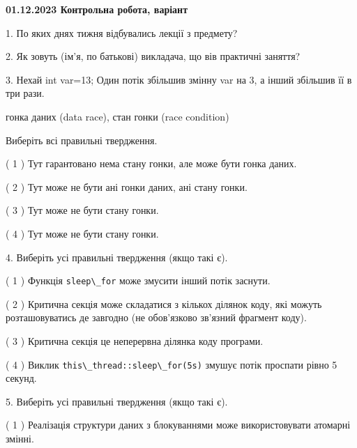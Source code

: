 \documentclass[12pt, ukrainian]{article}
\def\code#1{\Verb!#1!}
\begin{document}
\vspace{4mm}
\newpage
\begin {large}

\textbf{01.12.2023 Контрольна робота, варіант  }\par


{
1. По яких днях тижня відбувались лекції з предмету?



\vspace{5mm}
2. Як зовуть (ім'я, по батькові) викладача, що вів практичні заняття?



\vspace{5mm}
3. Нехай int var=13; Один потік збільшив змінну var на 3, а інший збільшив її в три рази.

гонка даних (data race), стан гонки (race condition)

Виберіть всі правильні твердження.\par
\vspace{2mm}
( 1 ) Тут гарантовано нема стану гонки, але може бути гонка даних.%

( 2 ) Тут може не бути ані гонки даних, ані стану гонки.%

( 3 ) Тут може не бути стану гонки.%

( 4 ) Тут може не бути стану гонки.%


\vspace{5mm}
4. Виберіть усі правильні твердження (якщо такі є).\par
\vspace{2mm}

( 1 ) Функція \code{sleep\_for} може змусити інший потік заснути.%

( 2 ) Критична секція може складатися з кількох ділянок коду, які можуть розташовуватись де завгодно (не обов’язково зв’язний фрагмент коду).%

( 3 ) Критична секція це неперервна ділянка коду програми.%

( 4 ) Виклик \code{this\_thread::sleep\_for(5s)} змушує потік проспати рівно 5 секунд.%


\vspace{5mm}
5. Виберіть усі правильні твердження (якщо такі є).\par
\vspace{2mm}

( 1 ) Реалізація структури даних з блокуваннями може використовувати атомарні змінні.%

}
\end{large}
\end{document}
